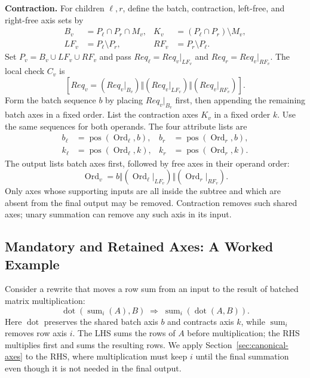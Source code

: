 \noindent\textbf{Contraction.}
For children $\ell,r$, define the batch, contraction, left-free, and
right-free axis sets by
\begin{equation}
\begin{aligned}
 B_v&=P_\ell\cap P_r\cap M_v,&
 K_v&=(P_\ell\cap P_r)\setminus M_v,\\
 LF_v&=P_\ell\setminus P_r,&
 RF_v&=P_r\setminus P_\ell.
\end{aligned}
\label{eq:canonical-roles}
\end{equation}
Set $P_v=B_v\cup LF_v\cup RF_v$ and pass
$Req_\ell=Req_v|_{LF_v}$ and $Req_r=Req_v|_{RF_v}$.
The local check $C_v$ is
\begin{equation}
 \left[Req_v=(Req_v|_{B_v})\Vert(Req_v|_{LF_v})\Vert(Req_v|_{RF_v})\right].
 \label{eq:block-order}
\end{equation}
Form the batch sequence $b$ by placing $Req_v|_{B_v}$ first, then appending
the remaining batch axes in a fixed order. List the contraction axes
$K_v$ in a fixed order $k$. Use the same sequences for both operands.
The four attribute lists are
\begin{equation}
\begin{aligned}
 b_\ell&=\operatorname{pos}(\operatorname{Ord}_\ell,b),&
 b_r&=\operatorname{pos}(\operatorname{Ord}_r,b),\\
 k_\ell&=\operatorname{pos}(\operatorname{Ord}_\ell,k),&
 k_r&=\operatorname{pos}(\operatorname{Ord}_r,k).
\end{aligned}
\label{eq:formal-attributes}
\end{equation}
The output lists batch axes first, followed by free axes in their operand
order:
\begin{equation}
 \operatorname{Ord}_v=b\Vert
 (\operatorname{Ord}_\ell|_{LF_v})\Vert
 (\operatorname{Ord}_r|_{RF_v}).
 \label{eq:constructed-order}
\end{equation}
Only axes whose supporting inputs are all inside the subtree and which
are absent from the final output may be removed. Contraction removes
such shared axes; unary summation can remove any such axis in its input.

\subsection{Mandatory and Retained Axes: A Worked Example}
\label{app:canonical-axes-example}
Consider a rewrite that moves a row sum from an input to the result of
batched matrix multiplication:
\begin{equation}
 \operatorname{dot}(\operatorname{sum}_i(A),B)
 \;\Rightarrow\;
 \operatorname{sum}_i(\operatorname{dot}(A,B)).
\end{equation}
Here $\operatorname{dot}$ preserves the shared batch axis $b$ and contracts
axis $k$, while $\operatorname{sum}_i$ removes row axis $i$. The LHS sums
the rows of $A$ before multiplication; the RHS multiplies first and sums
the resulting rows. We apply Section~\ref{sec:canonical-axes} to the RHS,
where multiplication must keep $i$ until the final summation even though
it is not needed in the final output.

